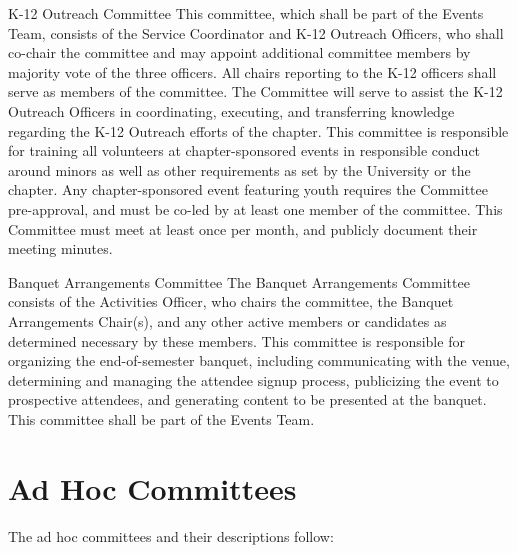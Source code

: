 \begin{enumsubsection}
  \item{K-12 Outreach Committee}
  This committee, which shall be part of the Events Team, consists of the Service Coordinator and K-12 Outreach Officers, who shall co-chair the committee and may appoint additional committee members by majority vote of the three officers.
  All chairs reporting to the K-12 officers shall serve as members of the committee.
  The Committee will serve to assist the K-12 Outreach Officers in coordinating, executing, and transferring knowledge regarding the K-12 Outreach efforts of the chapter.
  This committee is responsible for training all volunteers at chapter-sponsored events in responsible conduct around minors as well as other requirements as set by the University or the chapter.
  Any chapter-sponsored event featuring youth requires the Committee pre-approval, and must be co-led by at least one member of the committee.
  This Committee must meet at least once per month, and publicly document their meeting minutes.

  \item{Banquet Arrangements Committee}
The Banquet Arrangements Committee consists of the Activities Officer, who chairs the committee, the Banquet Arrangements Chair(s), and any other active members or candidates as determined necessary by these members.
This committee is responsible for organizing the end-of-semester banquet, including communicating with the venue, determining and managing the attendee signup process, publicizing the event to prospective attendees, and generating content to be presented at the banquet.
This committee shall be part of the Events Team.
\end{enumsubsection}

\section{Ad Hoc Committees}\label{sec:AdHocCommittees}
The ad hoc committees and their descriptions follow:\\





